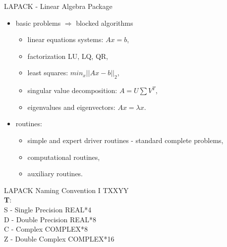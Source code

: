 	\begin{frame}{LAPACK - Linear Algebra Package}
		\begin{itemize}
			\item basic problems $\Rightarrow$ blocked algorithms
			\begin{itemize}
				\item linear equations systems: $Ax = b$, 
				\item factorization LU, LQ, QR,
				\item least squares: $min_x ||Ax - b ||_2$,
				\item singular value decomposition: $A = U\sum V^T$,
				\item eigenvalues and eigenvectors: $Ax = \lambda x$.
			\end{itemize}
			\item routines:
			\begin{itemize}
				\item simple and expert driver routines - standard complete problems,
				\item computational routines,
				\item auxiliary routines.
			\end{itemize}
		\end{itemize}
	\end{frame}
	\begin{frame}{LAPACK Naming Convention I}
	TXXYY \\
	\vspace{5mm}
	\textbf{T}: \\
	S - Single Precision REAL*4 \\
	D - Double Precision REAL*8 \\
	C - Complex COMPLEX*8 \\
	Z - Double Complex COMPLEX*16 
	\end{frame}
